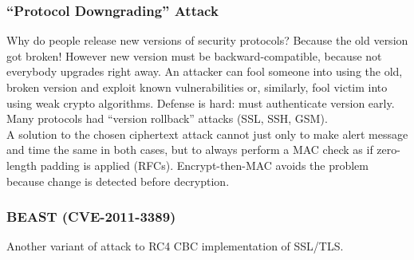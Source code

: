\documentclass[a4paper, 10pt, titlepage]{article}
\begin{document}
\subsubsection*{“Protocol Downgrading” Attack}
Why do people release new versions of security protocols? Because the old version got broken! However new version must be backward-compatible, because not everybody upgrades right away. An attacker can fool someone into using the old, broken version and exploit known vulnerabilities or, similarly, fool victim into using weak crypto algorithms. Defense is hard: must authenticate version early. Many protocols had “version rollback” attacks (SSL, SSH, GSM).\medskip\\
A solution to the chosen ciphertext attack cannot just only to make alert message and time the same in both cases, but to always perform a MAC check as if zero-length padding is applied (RFCs). Encrypt-then-MAC avoids the problem because change is detected before decryption.

\subsubsection{BEAST (CVE-2011-3389)}
Another variant of attack to RC4 CBC implementation of SSL/TLS.
\end{document}
